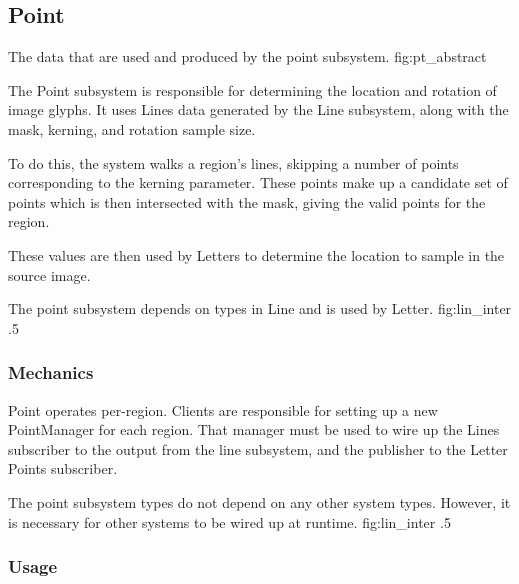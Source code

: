 \subsection{Point}

{The data that are used and produced by the point subsystem.}
{fig:pt_abstract}

The Point subsystem is responsible for determining the location and rotation of image glyphs.
It uses Lines data generated by the Line subsystem, along with the mask, kerning, and rotation sample size.

To do this, the system walks a region's lines, skipping a number of points corresponding to the kerning parameter.
These points make up a candidate set of points which is then intersected with the mask, giving the valid points for the region.

These values are then used by Letters to determine the location to sample in the source image.


{The point subsystem depends on types in Line and is used by Letter.}
{fig:lin_inter}
{.5}

\subsubsection{Mechanics}
Point operates per-region.
Clients are responsible for setting up a new PointManager for each region.
That manager must be used to wire up the Lines subscriber to the output from the line subsystem, and the publisher to the Letter Points subscriber.

{The point subsystem types do not depend on any other system types.  However, it is necessary for other systems to be wired up at runtime.}
{fig:lin_inter}
{.5}

\subsubsection{Usage}
